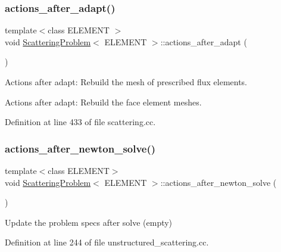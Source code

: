 \subsubsection{\texorpdfstring{actions\+\_\+after\+\_\+adapt()}{actions\_after\_adapt()}\hspace{0.1cm}{\footnotesize\ttfamily [2/2]}}
{\footnotesize\ttfamily template$<$class E\+L\+E\+M\+E\+NT $>$ \\
void \hyperlink{classScatteringProblem}{Scattering\+Problem}$<$ E\+L\+E\+M\+E\+NT $>$\+::actions\+\_\+after\+\_\+adapt (\begin{DoxyParamCaption}{ }\end{DoxyParamCaption})}



Actions after adapt\+: Rebuild the mesh of prescribed flux elements. 

Actions after adapt\+: Rebuild the face element meshes. 

Definition at line 433 of file scattering.\+cc.

\mbox{\label{classScatteringProblem_abf1e7b97518c94e12802205dec08b15e}} 
\subsubsection{\texorpdfstring{actions\+\_\+after\+\_\+newton\+\_\+solve()}{actions\_after\_newton\_solve()}\hspace{0.1cm}{\footnotesize\ttfamily [1/2]}}
{\footnotesize\ttfamily template$<$class E\+L\+E\+M\+E\+NT$>$ \\
void \hyperlink{classScatteringProblem}{Scattering\+Problem}$<$ E\+L\+E\+M\+E\+NT $>$\+::actions\+\_\+after\+\_\+newton\+\_\+solve (\begin{DoxyParamCaption}{ }\end{DoxyParamCaption})\hspace{0.3cm}{\ttfamily [inline]}}



Update the problem specs after solve (empty) 



Definition at line 244 of file unstructured\+\_\+scattering.\+cc.

